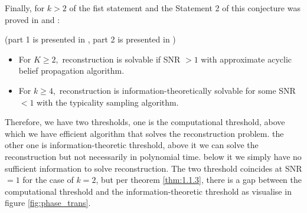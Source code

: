 Finally, for $k>2$ of the fist statement and the Statement 2 of this conjecture was proved in \cite{as16a} and \cite{As16b}:
\begin{theorem}\label{thm:1.1.3}
(part 1 is presented in \cite{As16b}, part 2 is presented in \cite{as16a})
\begin{itemize}
    \item For $K\geq2,$ reconstruction is solvable if SNR $>1$ with approximate
acyclic belief propagation algorithm.
    \item For $k\geq4,$ reconstruction is information-theoretically solvable for some SNR $<1$ with the typicality sampling algorithm.
\end{itemize}
\end{theorem}
\begin{remark}
    Therefore, we have two thresholds, one is the computational threshold, above which we have efficient algorithm that solves the reconstruction problem. the other one is information-theoretic threshold, above it we can solve the reconstruction but not necessarily in polynomial time. below it we simply have no sufficient information to solve reconstruction. The two threshold coincides at SNR $=1$ for the case of $k=2$, but per theorem \ref{thm:1.1.3}, there is a gap between the computational threshold and the information-theoretic threshold as visualise in figure \ref{fig:phase_trans}.
\end{remark}
\clearpage
